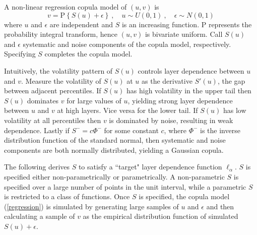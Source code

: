 \documentclass[authoryear]{elsarticle}
\newcommand{\p}{\mathrm{P}}
\newcommand{\cq}{\ ,\quad }
\newcommand{\eref}[1]{(\ref{#1})}
\begin{document}
A non-linear regression copula model of $(u,v)$ is
\begin{equation}\label{regression}
v=\p\left\{S(u)+\epsilon\right\} \cq u\sim U(0,1) \cq \epsilon\sim N(0,1)
\end{equation}
where $u$ and $\epsilon$ are independent and $S$ is an increasing function. $\p$ represents the probability integral transform, hence $(u,v)$ is bivariate uniform. Call $S(u)$ and $\epsilon$ systematic and noise components of the copula model, respectively. Specifying $S$ completes the copula model.

Intuitively, the volatility pattern of $S(u)$ controls layer dependence between $u$ and $v$. Measure the volatility of $S(u)$ at $u$ as the derivative $S'(u)$, the gap between adjacent percentiles. If $S(u)$ has high volatility in the upper tail then $S(u)$ dominates $v$ for large values of $u$, yielding strong layer dependence between $u$ and $v$ at high layers. Vice versa for the lower tail. If $S(u)$ has low volatility at all percentiles then $v$ is dominated by noise, resulting in weak dependence. Lastly if $S^-=c\Phi^-$ for some constant $c$, where $\Phi^-$ is the inverse distribution function of the standard normal, then systematic and noise components are both normally distributed, yielding a Gaussian copula.

The following derives $S$ to satisfy a ``target" layer dependence function $\ell_\alpha$. $S$ is specified either non-parametrically or parametrically. A non-parametric $S$ is specified over a large number of points in the unit interval, while a parametric $S$ is restricted to a class of functions. Once $S$ is specified, the copula model \eref{regression} is simulated by generating large samples of $u$ and $\epsilon$ and then calculating a sample of $v$ as the empirical distribution function of simulated $S(u)+\epsilon$.
\end{document}
